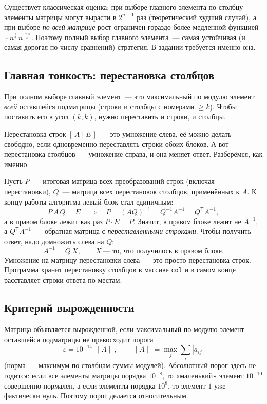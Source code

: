 \documentclass[11pt,a4paper]{report}
\begin{document}
Существует классическая оценка: при выборе главного элемента по столбцу элементы
матрицы могут вырасти в $2^{n-1}$ раз (теоретический худший случай), а при выборе
\emph{по всей матрице} рост ограничен гораздо более медленной функцией
$\sim n^{\frac{1}{2}}\,n^{\frac{\ln n}{4}}$. Поэтому полный выбор главного
элемента~--- самая устойчивая (и самая дорогая по числу сравнений) стратегия.
В задании требуется именно она.

\subsection{Главная тонкость: перестановка столбцов}

При полном выборе главный элемент~--- это максимальный по модулю элемент
\emph{всей} оставшейся подматрицы (строки и столбцы с номерами $\ge k$). Чтобы
поставить его в угол $(k,k)$, нужно переставить и строки, и столбцы.

Перестановка строк $[\,A\mid E\,]$~--- это умножение слева, её можно делать
свободно, если одновременно переставлять строки обоих блоков. А вот перестановка
столбцов~--- умножение справа, и она меняет ответ. Разберёмся, как именно.

Пусть $P$~--- итоговая матрица всех преобразований строк (включая перестановки),
$Q$~--- матрица всех перестановок столбцов, применённых к $A$. К концу работы
алгоритма левый блок стал единичным:
\[
P\,A\,Q=E \quad\Longrightarrow\quad P=(AQ)^{-1}=Q^{-1}A^{-1}=Q^{\mathsf T}A^{-1},
\]
а в правом блоке лежит как раз $P\cdot E=P$. Значит, в правом блоке лежит не
$A^{-1}$, а $Q^{\mathsf T}A^{-1}$~--- обратная матрица с \emph{переставленными
строками}. Чтобы получить ответ, надо домножить слева на $Q$:
\[
A^{-1}=Q\,X,\qquad X~\text{--- то, что получилось в правом блоке.}
\]
Умножение на матрицу перестановки слева~--- это просто перестановка строк.
Программа хранит перестановку столбцов в массиве \texttt{col} и в самом конце
расставляет строки ответа по местам.

\subsection{Критерий вырожденности}

Матрица объявляется вырожденной, если максимальный по модулю элемент оставшейся
подматрицы не превосходит порога
\[
\varepsilon = 10^{-14}\,\|A\|,\qquad
\|A\| = \max_{j}\sum_{i}|a_{ij}|
\]
(норма~--- максимум по столбцам суммы модулей). Абсолютный порог здесь не
годится: если все элементы матрицы порядка $10^{-8}$, то «маленький» элемент
$10^{-10}$ совершенно нормален, а если элементы порядка $10^{8}$, то элемент
$1$ уже фактически нуль. Поэтому порог делается относительным.
\end{document}
